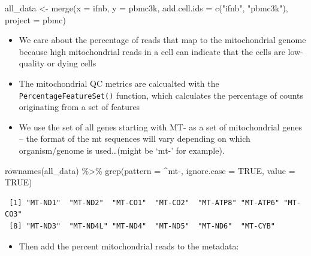 \documentclass[
  letterpaper,
  DIV=11,
  numbers=noendperiod]{scrreprt}
\newenvironment{Shaded}{\begin{snugshade}}{\end{snugshade}}
\newcommand{\AttributeTok}[1]{\textcolor[rgb]{0.40,0.45,0.13}{#1}}
\newcommand{\ConstantTok}[1]{\textcolor[rgb]{0.56,0.35,0.01}{#1}}
\newcommand{\FunctionTok}[1]{\textcolor[rgb]{0.28,0.35,0.67}{#1}}
\newcommand{\NormalTok}[1]{\textcolor[rgb]{0.00,0.23,0.31}{#1}}
\newcommand{\OtherTok}[1]{\textcolor[rgb]{0.00,0.23,0.31}{#1}}
\newcommand{\SpecialCharTok}[1]{\textcolor[rgb]{0.37,0.37,0.37}{#1}}
\newcommand{\StringTok}[1]{\textcolor[rgb]{0.13,0.47,0.30}{#1}}
\providecommand{\tightlist}{%
  \setlength{\itemsep}{0pt}\setlength{\parskip}{0pt}}
\begin{document}
\begin{Shaded}
\begin{Highlighting}[]
\NormalTok{all\_data }\OtherTok{\textless{}{-}} \FunctionTok{merge}\NormalTok{(}\AttributeTok{x =}\NormalTok{ ifnb, }\AttributeTok{y =}\NormalTok{ pbmc3k, }\AttributeTok{add.cell.ids =} \FunctionTok{c}\NormalTok{(}\StringTok{"ifnb"}\NormalTok{, }\StringTok{"pbmc3k"}\NormalTok{), }\AttributeTok{project =} \StringTok{\textquotesingle{}pbmc\textquotesingle{}}\NormalTok{)}
\end{Highlighting}
\end{Shaded}

\begin{itemize}
\tightlist
\item
  We care about the percentage of reads that map to the mitochondrial
  genome because high mitochondrial reads in a cell can indicate that
  the cells are low-quality or dying cells
\item
  The mitochondrial QC metrics are calcualted with the
  \texttt{PercentageFeatureSet()} function, which calculates the
  percentage of counts originating from a set of features
\item
  We use the set of all genes starting with MT- as a set of
  mitochondrial genes -- the format of the mt sequences will vary
  depending on which organism/genome is used\ldots(might be `mt-' for
  example).
\end{itemize}

\begin{Shaded}
\begin{Highlighting}[]
\FunctionTok{rownames}\NormalTok{(all\_data) }\SpecialCharTok{\%\textgreater{}\%} \FunctionTok{grep}\NormalTok{(}\AttributeTok{pattern =} \StringTok{\textquotesingle{}\^{}mt{-}\textquotesingle{}}\NormalTok{, }\AttributeTok{ignore.case =} \ConstantTok{TRUE}\NormalTok{, }\AttributeTok{value =} \ConstantTok{TRUE}\NormalTok{)}
\end{Highlighting}
\end{Shaded}

\begin{verbatim}
 [1] "MT-ND1"  "MT-ND2"  "MT-CO1"  "MT-CO2"  "MT-ATP8" "MT-ATP6" "MT-CO3" 
 [8] "MT-ND3"  "MT-ND4L" "MT-ND4"  "MT-ND5"  "MT-ND6"  "MT-CYB" 
\end{verbatim}

\begin{itemize}
\tightlist
\item
  Then add the percent mitochondrial reads to the metadata:
\end{itemize}
\end{document}
